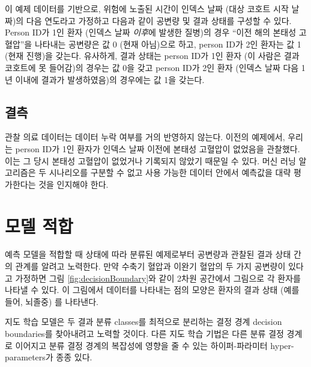 \documentclass[10.5pt]{book}
\theoremstyle{definition}
\theoremstyle{definition}
\theoremstyle{definition}
\theoremstyle{remark}
\begin{document}
이 예제 데이터를 기반으로, 위험에 노출된 시간이 인덱스 날짜 (대상 코호트
시작 날짜)의 다음 연도라고 가정하고 다음과 같이 공변량 및 결과 상태를
구성할 수 있다. Person ID가 1인 환자 (인덱스 날짜 \emph{이후}에 발생한
질병)의 경우 ``이전 해의 본태성 고혈압''을 나타내는 공변량은 값 0 (현재
아님)으로 하고, person ID가 2인 환자는 값 1 (현재 진행)을 갖는다.
유사하게, 결과 상태는 person ID가 1인 환자 (이 사람은 결과 코호트에 못
들어감)의 경우는 값 0을 갖고 person ID가 2인 환자 (인덱스 날짜 다음 1년
이내에 결과가 발생하였음)의 경우에는 값 1을 갖는다.

\subsection{결측}

관찰 의료 데이터는 데이터 누락 여부를 거의 반영하지 않는다. 이전의
예제에서, 우리는 person ID가 1인 환자가 인덱스 날짜 이전에 본태성
고혈압이 없었음을 관찰했다. 이는 그 당시 본태성 고혈압이 없었거나
기록되지 않았기 때문일 수 있다. 머신 러닝 알고리즘은 두 시나리오를
구분할 수 없고 사용 가능한 데이터 안에서 예측값을 대략 평가한다는 것을
인지해야 한다. 

\section{모델 적합}\label{modelFitting}

예측 모델을 적합할 때 상태에 따라 분류된 예제로부터 공변량과 관찰된 결과
상태 간의 관계를 알려고 노력한다. 만약 수축기 혈압과 이완기 혈압의 두
가지 공변량이 있다고 가정하면 그림 \ref{fig:decisionBoundary}와 같이
2차원 공간에서 그림으로 각 환자를 나타낼 수 있다. 이 그림에서 데이터를
나타내는 점의 모양은 환자의 결과 상태 (예를 들어, 뇌졸중) 를 나타낸다.

지도 학습 모델은 두 결과 분류 classes를 최적으로 분리하는 결정 경계
decision boundaries를 찾아내려고 노력할 것이다. 다른 지도 학습 기법은
다른 분류 결정 경계로 이어지고 분류 결정 경계의 복잡성에 영향을 줄 수
있는 하이퍼-파라미터 hyper-parameters가 종종 있다.
\end{document}
